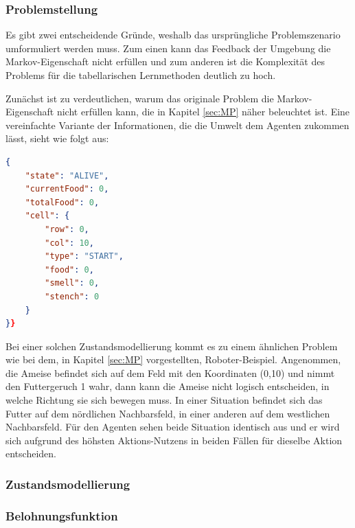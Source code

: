 \subsubsection{Problemstellung}
Es gibt zwei entscheidende Gründe, weshalb das ursprüngliche Problemszenario umformuliert werden muss. Zum einen kann das Feedback der Umgebung die Markov-Eigenschaft nicht erfüllen und zum anderen ist die Komplexität des Problems für die tabellarischen Lernmethoden deutlich zu hoch.
\par
Zunächst ist zu verdeutlichen, warum das originale Problem die Markov-Eigenschaft nicht erfüllen kann, die in Kapitel \ref{sec:MP} näher beleuchtet ist. Eine vereinfachte Variante der Informationen, die die Umwelt dem Agenten zukommen lässt, sieht wie folgt aus:
\begin{lstlisting}[language=json,firstnumber=1, label=lst:bar,caption=bar]
{
    "state": "ALIVE",
    "currentFood": 0,
    "totalFood": 0,
    "cell": {
        "row": 0,
        "col": 10,
        "type": "START",
        "food": 0,
        "smell": 0,
        "stench": 0
    }
}}
\end{lstlisting}
Bei einer solchen Zustandsmodellierung kommt es zu einem ähnlichen Problem wie bei dem, in Kapitel \ref{sec:MP} vorgestellten, Roboter-Beispiel. Angenommen, die Ameise befindet sich auf dem Feld mit den Koordinaten (0,10) und nimmt den Futtergeruch 1 wahr, dann kann die Ameise nicht logisch entscheiden, in welche Richtung sie sich bewegen muss. In einer Situation befindet sich das Futter auf dem nördlichen Nachbarsfeld, in einer anderen auf dem westlichen Nachbarsfeld. Für den Agenten sehen beide Situation identisch aus und er wird sich aufgrund des höhsten Aktions-Nutzens in beiden Fällen für dieselbe Aktion entscheiden.
\subsubsection{Zustandsmodellierung}

\subsubsection{Belohnungsfunktion}